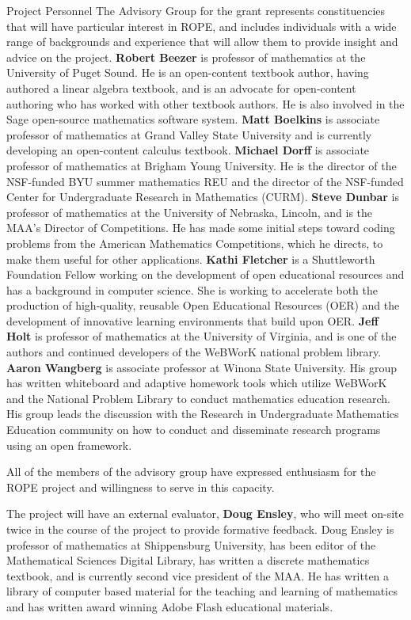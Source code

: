 \documentclass[11pt]{article}
\begin{document}
\begin{section}{Project Personnel}
The Advisory Group for the grant represents constituencies that will have
particular interest in ROPE, and includes individuals with a wide range
of backgrounds and experience that will allow them to provide insight and
advice on the project.  \textbf{Robert Beezer} is professor of mathematics
at the University of Puget Sound.  He is an open-content textbook author,
having authored a linear algebra textbook, and is an advocate for
open-content authoring who has worked with other textbook authors.  He is
also involved in the Sage open-source mathematics software system.
\textbf{Matt Boelkins} is associate professor of mathematics at Grand
Valley State University and is currently developing an open-content
calculus textbook.  \textbf{Michael Dorff} is associate professor of
mathematics at Brigham Young University.  He is the director of the
NSF-funded BYU summer mathematics REU and the director of the NSF-funded
Center for Undergraduate Research in Mathematics (CURM).  \textbf{Steve
Dunbar} is professor of mathematics at the University of Nebraska,
Lincoln, and is the MAA's Director of Competitions.  He has made some
initial steps toward coding problems from the American Mathematics
Competitions, which he directs, to make them useful for other
applications.  \textbf{Kathi Fletcher} is a Shuttleworth Foundation Fellow
working on the development of open educational resources and has a
background in computer science.  She is working to accelerate both the
production of high-quality, reusable Open Educational Resources (OER) and
the development of innovative learning environments that build upon OER.
\textbf{Jeff Holt} is professor of mathematics at the University of
Virginia, and is one of the authors and continued developers of the
WeBWorK national problem library.  \textbf{Aaron Wangberg} is associate
professor at Winona State University.  His group has written whiteboard
and adaptive homework tools which utilize WeBWorK and the National Problem
Library to conduct mathematics education research.  His group leads the
discussion with the Research in Undergraduate Mathematics Education
community on how to conduct and disseminate research programs using an
open framework.

All of the members of the advisory group have expressed enthusiasm for the ROPE project and willingness to serve in this capacity.

The project will have an external evaluator, \textbf{Doug Ensley}, who
will meet on-site twice in the course of the project to provide formative
feedback.  Doug Ensley is professor of mathematics at Shippensburg
University, has been editor of the Mathematical Sciences Digital Library,
has written a discrete mathematics textbook, and is currently second vice
president of the MAA.  He has written a library of computer based material
for the teaching and learning of mathematics and has written award winning
Adobe Flash educational materials.


\end{section}
\end{document}

